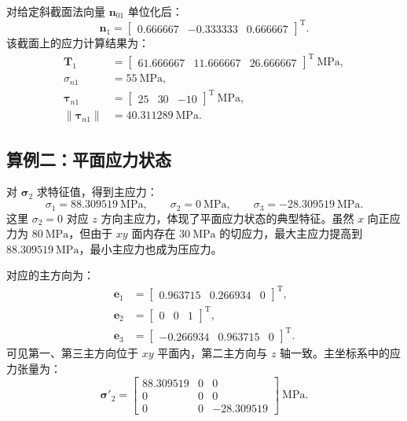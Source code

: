 \documentclass[UTF8,a4paper,12pt]{ctexart}
\newcommand{\stress}{\bm{\sigma}}
\newcommand{\vect}[1]{\bm{#1}}
\begin{document}
对给定斜截面法向量 $\vect n_{01}$ 单位化后：
\begin{equation}
\vect n_1=\begin{bmatrix}0.666667 & -0.333333 & 0.666667\end{bmatrix}^{\mathrm T}.
\end{equation}
该截面上的应力计算结果为：
\begin{align}
\vect T_1 &= \begin{bmatrix}61.666667 & 11.666667 & 26.666667\end{bmatrix}^{\mathrm T}\ \mathrm{MPa},\\
\sigma_{n1} &= 55\ \mathrm{MPa},\\
\vect\tau_{n1} &= \begin{bmatrix}25 & 30 & -10\end{bmatrix}^{\mathrm T}\ \mathrm{MPa},\\
\lVert\vect\tau_{n1}\rVert &= 40.311289\ \mathrm{MPa}.
\end{align}

\subsection{算例二：平面应力状态}

对 $\stress_2$ 求特征值，得到主应力：
\begin{equation}
\sigma_1=88.309519\ \mathrm{MPa},\qquad
\sigma_2=0\ \mathrm{MPa},\qquad
\sigma_3=-28.309519\ \mathrm{MPa}.
\end{equation}
这里 $\sigma_2=0$ 对应 $z$ 方向主应力，体现了平面应力状态的典型特征。虽然 $x$ 向正应力为 $80\ \mathrm{MPa}$，但由于 $xy$ 面内存在 $30\ \mathrm{MPa}$ 的切应力，最大主应力提高到 $88.309519\ \mathrm{MPa}$，最小主应力也成为压应力。

对应的主方向为：
\begin{align}
\vect e_1 &= \begin{bmatrix}0.963715 & 0.266934 & 0\end{bmatrix}^{\mathrm T},\\
\vect e_2 &= \begin{bmatrix}0 & 0 & 1\end{bmatrix}^{\mathrm T},\\
\vect e_3 &= \begin{bmatrix}-0.266934 & 0.963715 & 0\end{bmatrix}^{\mathrm T}.
\end{align}
可见第一、第三主方向位于 $xy$ 平面内，第二主方向与 $z$ 轴一致。主坐标系中的应力张量为：
\begin{equation}
\stress'_2 =
\begin{bmatrix}
88.309519 & 0 & 0 \\
0 & 0 & 0 \\
0 & 0 & -28.309519
\end{bmatrix}\ \mathrm{MPa}.
\end{equation}
\end{document}
